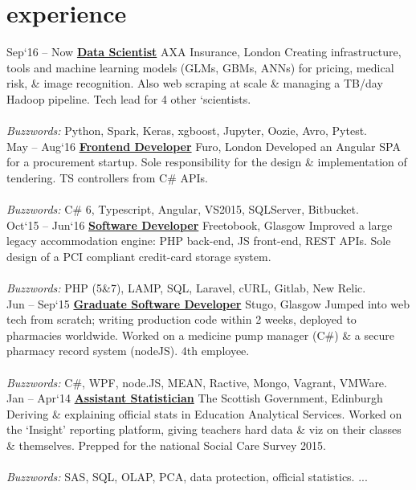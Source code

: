 \documentclass[]{friggeri-cv}
\newcommand{\axaJob}{\href{https://web.archive.org/web/20170113182017/https://www.kaggle.com/jobs/17128/axa-insurance-data-scientist-london}{\textbf{Data Scientist}}}%
\newcommand{\furoJob}{\href{https://web.archive.org/web/20170113184959/https://1.bp.blogspot.com/-8MTHkoAbScc/WHkd2EI0liI/AAAAAAAAC1k/0ZWr2XpO_ewW3Hd1RDHTfv3O_jki3bNigCLcB/s1600/furo.png}{\textbf{\textbf{Frontend Developer}}}}%
\newcommand{\freeJob}{\href{http://web.archive.org/web/20170113190649/http://www.freetobook.com/}{\textbf{Software Developer}}}%
\newcommand{\stugoJob}{\href{http://web.archive.org/web/20170113185418/http://stugo.co.uk/}{\textbf{Graduate Software Developer}}}%
\newcommand{\govJob}{\href{http://web.archive.org/web/20170113190449/http://www.gov.scot/Resource/0047/00478784.pdf}{\textbf{Assistant Statistician}}}%
\newcommand{\standJob}{\href{http://web.archive.org/web/20170113190135/http://standinternational.org/about-us}{\textbf{\,\,Database Developer}}}%
\begin{document}
\section{experience}
\begin{entrylist}
	\smallskip\smallskip
	\entry
	{Sep‘16 – Now}
	{\axaJob{}}
    {AXA Insurance, London}
    {Creating infrastructure, tools and machine learning models (GLMs, GBMs, ANNs) for pricing, medical risk, \& image recognition. Also web scraping at scale \& managing a TB/day Hadoop pipeline. Tech lead for 4 other `scientists.
\\\\    
     \textit{Buzzwords:}	Python, Spark, Keras, xgboost, Jupyter, Oozie, Avro,  Pytest. }		
\\
%
	\smallskip\smallskip
	\entry
	{May – Aug‘16}
	{\furoJob{}}
    {Furo, London}
    {Developed an Angular SPA for a procurement startup. Sole responsibility for the design \& implementation of tendering. TS controllers from C\# APIs. 
\\\\
    \textit{Buzzwords:}	C\# 6, Typescript, Angular, VS2015, SQLServer, Bitbucket.}
\\
%
	\smallskip\smallskip
    \entry
	{Oct‘15 – Jun‘16}
	{\freeJob{}}
    {Freetobook, Glasgow}
    { Improved a large legacy accommodation engine: PHP back-end, JS front-end, REST APIs.
    Sole design of a PCI compliant credit-card storage system. 
\\\\
	\textit{Buzzwords:}	PHP (5\&7), LAMP, SQL, Laravel, cURL, Gitlab, New Relic.}	
\\
%
	\smallskip\smallskip
	\entry
	{Jun – Sep‘15}
	{\stugoJob{}}
    {Stugo, Glasgow}
    { Jumped into web tech from scratch; writing production code within 2 weeks, deployed to pharmacies worldwide. Worked on a medicine pump manager (C\#) \& a secure pharmacy record system (nodeJS). 4th employee. 
\\\\
	\textit{Buzzwords:}	C\#, WPF, node.JS, MEAN, Ractive, Mongo, Vagrant, VMWare. }	
\\
%	
%
	\smallskip\smallskip
	\entry
	{Jan – Apr‘14}
	{\govJob{}}
    {The Scottish Government, Edinburgh}
    {Deriving \& explaining official stats in Education Analytical Services. Worked on the `Insight' reporting platform, giving teachers hard data \& viz on their classes \& themselves. Prepped for the national Social Care Survey 2015. 
\\\\
	\textit{Buzzwords:}	SAS, SQL, OLAP, PCA, data protection, official statistics. }
	...
\end{entrylist}
%
% 
\\\\
\end{document}
